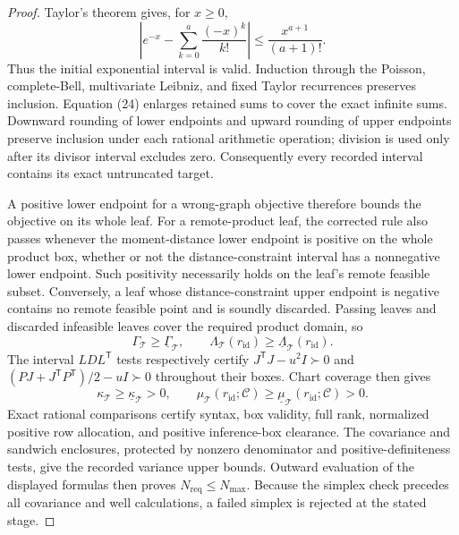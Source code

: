 \documentclass{article}
\begin{document}
\begin{proof}
Taylor's theorem gives, for \(x\geq0\),
\[
 \left|e^{-x}-\sum_{k=0}^{a}\frac{(-x)^k}{k!}\right|
 \leq\frac{x^{a+1}}{(a+1)!}. \tag{26}
\]
Thus the initial exponential interval is valid.  Induction through the Poisson, complete-Bell, multivariate Leibniz, and fixed Taylor recurrences preserves inclusion.  Equation (24) enlarges retained sums to cover the exact infinite sums.  Downward rounding of lower endpoints and upward rounding of upper endpoints preserve inclusion under each rational arithmetic operation; division is used only after its divisor interval excludes zero.  Consequently every recorded interval contains its exact untruncated target.

A positive lower endpoint for a wrong-graph objective therefore bounds the objective on its whole leaf.  For a remote-product leaf, the corrected rule also passes whenever the moment-distance lower endpoint is positive on the whole product box, whether or not the distance-constraint interval has a nonnegative lower endpoint.  Such positivity necessarily holds on the leaf's remote feasible subset.  Conversely, a leaf whose distance-constraint upper endpoint is negative contains no remote feasible point and is soundly discarded.  Passing leaves and discarded infeasible leaves cover the required product domain, so
\[
 \Gamma_{\mathcal T}\geq\underline\Gamma_{\mathcal T},
 \qquad
 \Lambda_{\mathcal T}(r_{\mathrm{id}})
 \geq\underline\Lambda_{\mathcal T}(r_{\mathrm{id}}). \tag{27}
\]
The interval \(LDL^{\mathsf T}\) tests respectively certify
\(J^{\mathsf T}J-u^2I\succ0\) and
\((PJ+J^{\mathsf T}P^{\mathsf T})/2-uI\succ0\) throughout their boxes.  Chart coverage then gives
\[
 \kappa_{\mathcal T}\geq\underline\kappa_{\mathcal T}>0,
 \qquad
 \mu_{\mathcal T}(r_{\mathrm{id}};\mathscr C)
 \geq\underline\mu_{\mathcal T}(r_{\mathrm{id}};\mathscr C)>0. \tag{28}
\]
Exact rational comparisons certify syntax, box validity, full rank, normalized positive row allocation, and positive inference-box clearance.  The covariance and sandwich enclosures, protected by nonzero denominator and positive-definiteness tests, give the recorded variance upper bounds.  Outward evaluation of the displayed formulas then proves \(N_{\mathrm{req}}\leq N_{\max}\).  Because the simplex check precedes all covariance and well calculations, a failed simplex is rejected at the stated stage.


\end{proof}
\end{document}
